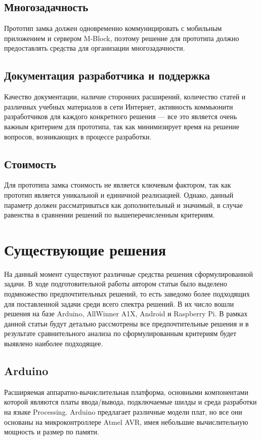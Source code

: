 \subsection{Многозадачность}
Прототип замка должен одновременно коммуницировать с мобильным приложением и сервером M-Block, поэтому решение для прототипа должно предоставлять средства для организации многозадачности.

\subsection{Документация разработчика и поддержка}
Качество документации, наличие сторонних расширений, количество статей и различных учебных материалов в сети Интернет, активность коммьюнити разработчиков для каждого конкретного решения --- все это является очень важным критерием для прототипа, так как минимизирует время на решение вопросов, возникающих в процессе разработки.

\subsection{Стоимость}
Для прототипа замка стоимость не является ключевым фактором, так как прототип является уникальной и единичной реализацией. Однако, данный параметр должен рассматриваться как дополнительный и значимый, в случае равенства в сравнении решений по вышеперечисленным критериям.

\section{Существующие решения}
На данный момент существуют различные средства решения сформулированной задачи. В ходе подготовительной работы автором статьи было выделено подмножество предпочтительных решений, то есть заведомо более подходящих для поставленной задачи среди всего спектра решений. В их число вошли решения на базе Arduino, AllWinner A1X, Android и Raspberry Pi. В рамках данной статьи будут детально рассмотрены все предпочтительные решения и в результате сравнительного анализа по сформулированным критериям будет выявлено наиболее подходящее.

\subsection{Arduino}
Расширяемая аппаратно-вычислительная платформа, основными компонентами которой являются платы ввода/вывода, подключаемые шилды и среда разработки на языке Processing. Arduino предлагает различные модели плат, но все они основаны на микроконтроллере Atmel AVR, имея небольшие вычислительную мощность и размер по памяти\cite{Arduino}.

